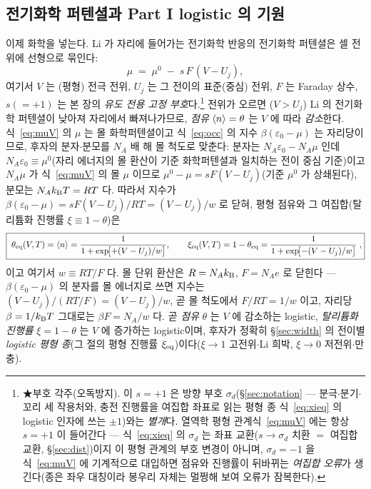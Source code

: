 \subsection{전기화학 퍼텐셜과 Part I logistic 의 기원}\label{ssec:logistic}
이제 화학을 넣는다. Li 가 자리에 들어가는 전기화학 반응의 전기화학 퍼텐셜은 셀 전위에 선형으로 묶인다:
\begin{equation}
\mu \;=\; \mu^0 \;-\; s\,F\,(V-U_j),
\label{eq:muV}
\end{equation}
여기서 $V$ 는 (평형) 전극 전위, $U_j$ 는 그 전이의 표준(중심) 전위, $F$ 는 Faraday 상수, $s(=+1)$ 는
본 장의 \emph{유도 전용 고정 부호}다.\footnote{★부호 각주(오독방지). 이 $s{=}+1$ 은 방향 부호 $\sigma_d$(\S\ref{sec:notation} ---
분극$\cdot$분기$\cdot$꼬리 세 작용처와, 충전 진행률을 여집합 좌표로 읽는 평형 종 식~\eqref{eq:xieq} 의
logistic 인자에 쓰는 $\pm1$)와는 \emph{별개}다. 열역학 평형 관계식~\eqref{eq:muV} 에는 항상 $s{=}+1$ 이
들어간다 --- 식~\eqref{eq:xieq} 의 $\sigma_d$ 는 좌표 교환($s\to\sigma_d$ 치환 $=$ 여집합 교환,
\S\ref{sec:dist})이지 이 평형 관계의 부호 변경이 아니며, $\sigma_d{=}-1$ 을 식~\eqref{eq:muV} 에 기계적으로
대입하면 점유와 진행률이 뒤바뀌는 \emph{여집합 오류}가 생긴다(종은 좌우 대칭이라 봉우리 자체는 멀쩡해
보여 오류가 잠복한다).} 전위가 오르면
($V>U_j$) Li 의 전기화학 퍼텐셜이 낮아져 자리에서 빠져나가므로, \emph{점유} $\langle n\rangle=\theta$ 는 $V$ 에 따라
\emph{감소}한다. 식~\eqref{eq:muV} 의 $\mu$ 는 몰 화학퍼텐셜이고 식~\eqref{eq:occ} 의 지수
$\beta(\varepsilon_0-\mu)$ 는 자리당이므로, 후자의 분자$\cdot$분모를 $N_A$ 배 해 몰 척도로 맞춘다: 분자는
$N_A\varepsilon_0-N_A\mu$ 인데 $N_A\varepsilon_0\equiv\mu^0$(자리 에너지의 몰 환산이 기준 화학퍼텐셜과 일치하는
전이 중심 기준)이고 $N_A\mu$ 가 식~\eqref{eq:muV} 의 몰 $\mu$ 이므로 $\mu^0-\mu=sF(V-U_j)$(기준 $\mu^0$ 가
상쇄된다), 분모는 $N_Ak_{\mathrm B} T=RT$ 다. 따라서 지수가 $\beta(\varepsilon_0-\mu)=sF(V-U_j)/RT=(V-U_j)/w$ 로 닫혀,
평형 점유와 그 여집합(탈리튬화 진행률 $\xi\equiv1-\theta$)은
\begin{equation}
\boxed{\;\theta_{\mathrm{eq}}(V,T)=\langle n\rangle=\frac{1}{1+\exp\!\bigl[+(V-U_j)/w\bigr]},\qquad
\xi_{\mathrm{eq}}(V,T)=1-\theta_{\mathrm{eq}}=\frac{1}{1+\exp\!\bigl[-(V-U_j)/w\bigr]}\;,}
\label{eq:logistic}
\end{equation}
이고 여기서 $w\equiv RT/F$ 다. 몰 단위 환산은 $R=N_Ak_{\mathrm B}$, $F=N_Ae$ 로 닫힌다 --- $\beta(\varepsilon_0-\mu)$ 의
분자를 몰 에너지로 쓰면 지수는 $(V-U_j)/(RT/F)=(V-U_j)/w$, 곧 몰 척도에서 $F/RT=1/w$ 이고, 자리당
$\beta=1/k_{\mathrm B} T$ 그대로는 $\beta F=N_A/w$ 다. 곧 \emph{점유} $\theta$ 는 $V$ 에 감소하는 logistic, \emph{탈리튬화
진행률} $\xi=1-\theta$ 는 $V$ 에 증가하는 logistic이며, 후자가 정확히 \S\ref{sec:width} 의 전이별 \emph{logistic
평형 종}(그 절의 평형 진행률 $\xi_{\mathrm{eq}}$)이다($\xi\to1$ 고전위$\cdot$Li 희박, $\xi\to0$ 저전위$\cdot$만충).

